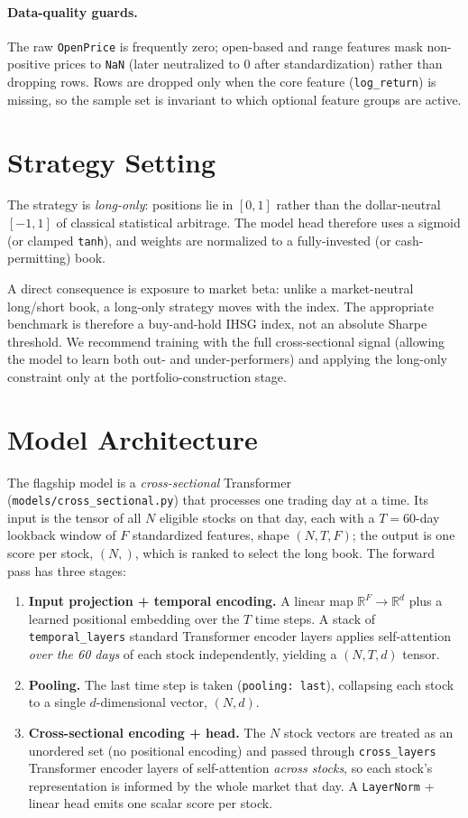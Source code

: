 \documentclass[10pt,twocolumn]{article}
\begin{document}
\paragraph{Data-quality guards.} The raw \texttt{OpenPrice} is frequently
zero; open-based and range features mask non-positive prices to
\texttt{NaN} (later neutralized to $0$ after standardization) rather than
dropping rows. Rows are dropped only when the core feature
(\texttt{log\_return}) is missing, so the sample set is invariant to
which optional feature groups are active.

\section{Strategy Setting}
The strategy is \emph{long-only}: positions lie in $[0,1]$ rather than
the dollar-neutral $[-1,1]$ of classical statistical arbitrage. The
model head therefore uses a sigmoid (or clamped \texttt{tanh}), and
weights are normalized to a fully-invested (or cash-permitting) book.

A direct consequence is exposure to market beta: unlike a
market-neutral long/short book, a long-only strategy moves with the
index. The appropriate benchmark is therefore a buy-and-hold IHSG index,
not an absolute Sharpe threshold. We recommend training with the full
cross-sectional signal (allowing the model to learn both out- and
under-performers) and applying the long-only constraint only at the
portfolio-construction stage.

\section{Model Architecture}
The flagship model is a \emph{cross-sectional} Transformer
(\texttt{models/cross\_sectional.py}) that processes one trading day at a
time. Its input is the tensor of all $N$ eligible stocks on that day,
each with a $T{=}60$-day lookback window of $F$ standardized features,
shape $(N, T, F)$; the output is one score per stock, $(N,)$, which is
ranked to select the long book. The forward pass has three stages:

\begin{enumerate}
\item \textbf{Input projection + temporal encoding.} A linear map
$\mathbb{R}^{F}\!\to\!\mathbb{R}^{d}$ plus a learned positional embedding
over the $T$ time steps. A stack of \texttt{temporal\_layers} standard
Transformer encoder layers applies self-attention \emph{over the 60 days}
of each stock independently, yielding a $(N, T, d)$ tensor.
\item \textbf{Pooling.} The last time step is taken (\texttt{pooling:
last}), collapsing each stock to a single $d$-dimensional vector, $(N,
d)$.
\item \textbf{Cross-sectional encoding + head.} The $N$ stock vectors are
treated as an unordered set (no positional encoding) and passed through
\texttt{cross\_layers} Transformer encoder layers of self-attention
\emph{across stocks}, so each stock's representation is informed by the
whole market that day. A \texttt{LayerNorm} + linear head emits one
scalar score per stock.
\end{enumerate}
\end{document}
